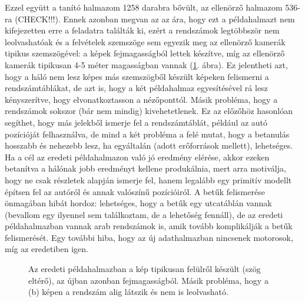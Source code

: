 \documentclass{article}
\begin{document}
Ezzel együtt a tanító halmazom 1258 darabra bővült, az ellenörző halmazom 536-ra (CHECK!!!). Ennek azonban megvan az az ára, hogy ezt a példahalmazt nem kifejezetten erre a feladatra találták ki, ezért a rendszámok legtöbbször nem leolvashatóak és a felvételek szemszöge sem egyezik meg az ellenörző kamerák tipikus szemszögével: a képek fejmagasságból lettek készítve, míg az ellenörző kamerák tipikusan 4-5 méter magasságban vannak (\ref{fig:orig_dataset_example}. ábra). Ez jelentheti azt, hogy a háló nem lesz képes más szemszögből készült képeken felismerni a rendszámtáblákat, de azt is, hogy a két példahalmaz egyesítésével rá lesz kényszerítve, hogy elvonatkoztasson a nézőponttól. Másik probléma, hogy a rendszámok sokszor (bár nem mindig) kivehetetlenek. Ez az előzőhöz hasonlóan segíthet, hogy más jelekből ismerje fel a rendszámtáblát, például az autó pozícióját felhasználva, de mind a két probléma a felé mutat, hogy a betanulás hosszabb és nehezebb lesz, ha egyáltalán (adott erőforrások mellett), lehetséges. Ha a cél az eredeti példahalmazon való jó eredmény elérése, akkor ezeken betanítva a hálónak jobb eredményt kellene produkálnia, mert arra motiválja, hogy ne csak részletek alapján ismerje fel, hanem legalább egy primitív modellt építsen fel az autóról és annak valószínű pozícióiról. A betűk felismerése önmagában hibát hordoz: lehetséges, hogy a betűk egy utcatáblán vannak (bevallom egy ilyennel sem találkoztam, de a lehetőség fennáll), de az eredeti példahalmazban vannak arab rendszámok is, amik tovább komplikálják a betűk felismerését. Egy további hiba, hogy az új adathalmazban nincsenek motorosok, míg az eredetiben igen.

\begin{figure}[h!]%
    \centering
    \qquad
    \centering
    \caption{Az eredeti példahalmazban a kép tipikusan felülről készült (szög eltérő), az újban azonban fejmagasságból. Másik probléma, hogy a (b) képen a rendszám alig látszik és nem is leolvasható.}%
    \label{fig:orig_dataset_example}%
\end{figure}
\end{document}
